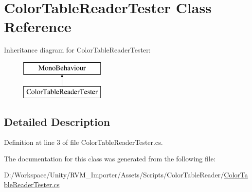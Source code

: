 \hypertarget{class_color_table_reader_tester}{}\section{Color\+Table\+Reader\+Tester Class Reference}
\label{class_color_table_reader_tester}
Inheritance diagram for Color\+Table\+Reader\+Tester\+:\begin{figure}[H]
\begin{center}
\leavevmode
\includegraphics[height=2.000000cm]{class_color_table_reader_tester}
\end{center}
\end{figure}


\subsection{Detailed Description}


Definition at line 3 of file Color\+Table\+Reader\+Tester.\+cs.



The documentation for this class was generated from the following file\+:\begin{DoxyCompactItemize}
\item 
D\+:/\+Workspace/\+Unity/\+R\+V\+M\+\_\+\+Importer/\+Assets/\+Scripts/\+Color\+Table\+Reader/\mbox{\hyperlink{_color_table_reader_tester_8cs}{Color\+Table\+Reader\+Tester.\+cs}}\end{DoxyCompactItemize}
